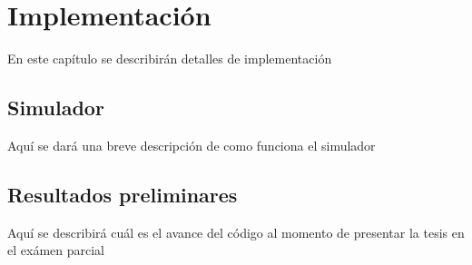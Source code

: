 \chapter{Implementación}

En este capítulo se describirán detalles de implementación


\section{Simulador}

Aquí se dará una breve descripción de como funciona el simulador


\section{Resultados preliminares}

Aquí se describirá cuál es el avance del código al momento de presentar la tesis en el exámen parcial